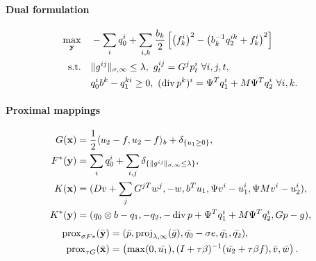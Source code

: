 \paragraph{Dual formulation}
\begin{align*}
    \max_{\mathbf{y}} \quad
        & -\sum_i q_0^i+ \sum_{i,k} \frac{b_k}{2} \left [
                \left(f_k^i\right)^2
                - \left(b_k^{-1} q_2^{ik} + f_k^i\right)^2
            \right ] \\
    \text{s.t.}\quad
        & \|g^{ij}\|_{\sigma,\infty} \leq \lambda,
          ~g^{ij}_t = G^j p^i_t ~\forall i,j,t, \\
        & q_0^i b^k - q_1^{ki} \geq 0,
          ~(\operatorname{div} p^k)^i = \Psi^T q_1^i + M \Psi^T q_2^i ~\forall i,k.
\end{align*}

\paragraph{Proximal mappings}
\begin{align*}
    G(\mathbf{x}) &= \frac{1}{2} \langle u_2-f, u_2-f \rangle_b
        + \delta_{\{u_1 \geq 0\}}, \\
    F^*(\mathbf{y}) &= \sum_{i} q_0^i
        + \sum_{i,j} \delta_{\{\|g^{ij}\|_{\sigma,\infty} \leq \lambda\}}, \\
    K(\mathbf{x}) &= (
        Dv + \sum_j G^{jT}w^{j},
        -w,
        b^T u_1,
        \Psi v^i - u_1^i,
        \Psi M v^i - u_2^i
    ), \\
    K^*(\mathbf{y}) &= (
        q_0 \otimes b - q_1,
        -q_2,
        -\operatorname{div}{p} + \Psi^T q_1^i + M \Psi^T q_2^i,
        Gp - g
    ),
\end{align*}
\begin{align*}
    \operatorname{prox}_{\sigma F*}(\bar{\mathbf{y}})
    &= (
        \bar{p},
        \operatorname{proj}_{\lambda,\infty}(\bar{g}),
        \bar{q_0}-\sigma e,
        \bar{q_1},
        \bar{q_2}
    ), \\
    \operatorname{prox}_{\tau G}(\bar{\mathbf{x}})
    &= \left(
        \max(0,\bar{u_1}),
        (I+\tau \beta)^{-1}(\bar{u_2} + \tau \beta f),
        \bar{v},
        \bar{w}
    \right).
\end{align*}

